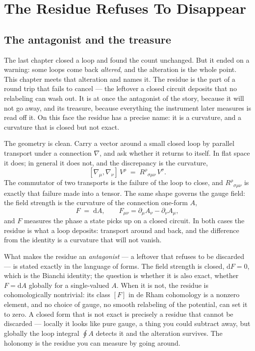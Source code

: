 \chapter{The Residue Refuses To Disappear}

\section{The antagonist and the treasure}

The last chapter closed a loop and found the count unchanged. But it ended on a warning: some loops come back
\emph{altered}, and the alteration is the whole point. This chapter meets that alteration and names it. The residue is the
part of a round trip that fails to cancel --- the leftover a closed circuit deposits that no relabeling can wash out. It is
at once the antagonist of the story, because it will not go away, and its treasure, because everything the instrument later
measures is read off it. On this face the residue has a precise name: it is a curvature, and a curvature that is closed but
not exact.

The geometry is clean. Carry a vector around a small closed loop by parallel transport under a connection $\nabla$, and ask
whether it returns to itself. In flat space it does; in general it does not, and the discrepancy is the curvature,
\[
  [\nabla_\mu, \nabla_\nu]\,V^\rho \;=\; R^{\rho}{}_{\sigma\mu\nu}\,V^\sigma .
\]
The commutator of two transports is the failure of the loop to close, and $R^{\rho}{}_{\sigma\mu\nu}$ is exactly that failure
made into a tensor. The same shape governs the gauge field: the field strength is the curvature of the connection one-form
$A$,
\[
  F \;=\; \mathrm{d}A, \qquad F_{\mu\nu} = \partial_\mu A_\nu - \partial_\nu A_\mu,
\]
and $F$ measures the phase a state picks up on a closed circuit. In both cases the residue is what a loop deposits: transport
around and back, and the difference from the identity is a curvature that will not vanish.

What makes the residue an \emph{antagonist} --- a leftover that refuses to be discarded --- is stated exactly in the language
of forms. The field strength is closed, $\mathrm{d}F = 0$, which is the Bianchi identity; the question is whether it is also
exact, whether $F = \mathrm{d}A$ globally for a single-valued $A$. When it is not, the residue is cohomologically nontrivial:
its class $[F]$ in de Rham cohomology is a nonzero element, and no choice of gauge, no smooth relabeling of the potential,
can set it to zero. A closed form that is not exact is precisely a residue that cannot be discarded --- locally it looks like
pure gauge, a thing you could subtract away, but globally the loop integral $\oint A$ detects it and the alteration survives.
The holonomy is the residue you can measure by going around.

